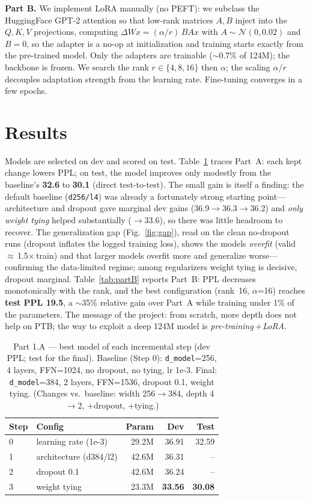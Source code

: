 \documentclass[a4paper]{article}
\begin{document}
\textbf{Part B.} We implement LoRA \cite{hu2022lora} manually (no PEFT): we subclass the
HuggingFace GPT-2 attention \cite{wolf2020transformers} so that low-rank matrices
$A,B$ inject into the $Q,K,V$ projections, computing $\Delta W x=(\alpha/r)\,BAx$ with
$A\sim\mathcal{N}(0,0.02)$ and $B=0$, so the adapter is a no-op at initialization and
training starts exactly from the pre-trained model. Only the adapters are trainable
($\sim$0.7\% of 124M); the backbone is frozen. We search the rank
$r\in\{4,8,16\}$ then $\alpha$; the scaling $\alpha/r$ decouples adaptation strength
from the learning rate. Fine-tuning converges in a few epochs.

\section{Results}
Models are selected on dev and scored on test. Table~\ref{tab:partA} traces Part~A:
each kept change lowers PPL; on test, the model improves only modestly from the
baseline's \textbf{32.6} to \textbf{30.1} (direct test-to-test). The small gain is
itself a finding: the default baseline (\texttt{d256/l4}) was already a fortunately
strong starting point---architecture and dropout gave marginal dev gains
(36.9$\to$36.3$\to$36.2) and \emph{only weight tying} helped substantially
($\to$33.6), so there was little headroom to recover. The generalization
gap (Fig.~\ref{fig:gap}), read on the
clean no-dropout runs (dropout inflates the logged training loss), shows the models
\emph{overfit} (valid\,$\approx$\,1.5$\times$\,train) and that larger models overfit
more and generalize worse---confirming the data-limited regime; among regularizers
weight tying is decisive, dropout marginal. Table~\ref{tab:partB} reports Part~B: PPL
decreases monotonically with the rank, and the best configuration (rank~16,
$\alpha$=16) reaches \textbf{test PPL 19.5}, a $\sim$35\% relative gain over Part~A
while training under 1\% of the parameters. The message of the project: from scratch,
more depth does not help on PTB; the way to exploit a deep 124M model is
\emph{pre-training\,+\,LoRA}.

\begin{table}[t]
  \centering
  \caption{Part 1.A --- best model of each incremental step (dev PPL; test for the
  final). Baseline (Step 0): \texttt{d\_model}=256, 4 layers, FFN=1024, no dropout, no
  tying, lr 1e-3. Final: \texttt{d\_model}=384, 2 layers, FFN=1536, dropout 0.1, weight
  tying. (Changes vs.\ baseline: width 256$\to$384, depth 4$\to$2, +dropout, +tying.)}
  \label{tab:partA}
  \begin{tabular}{llrrr}
    \toprule
    Step & Config & Param & Dev & Test \\
    \midrule
    0 & learning rate (1e-3)   & 29.2M & 36.91 & 32.59 \\
    1 & architecture (d384/l2) & 42.6M & 36.31 & -- \\
    2 & dropout 0.1            & 42.6M & 36.24 & -- \\
    3 & weight tying           & 23.3M & \textbf{33.56} & \textbf{30.08} \\
    \bottomrule
  \end{tabular}
\end{table}
\end{document}
